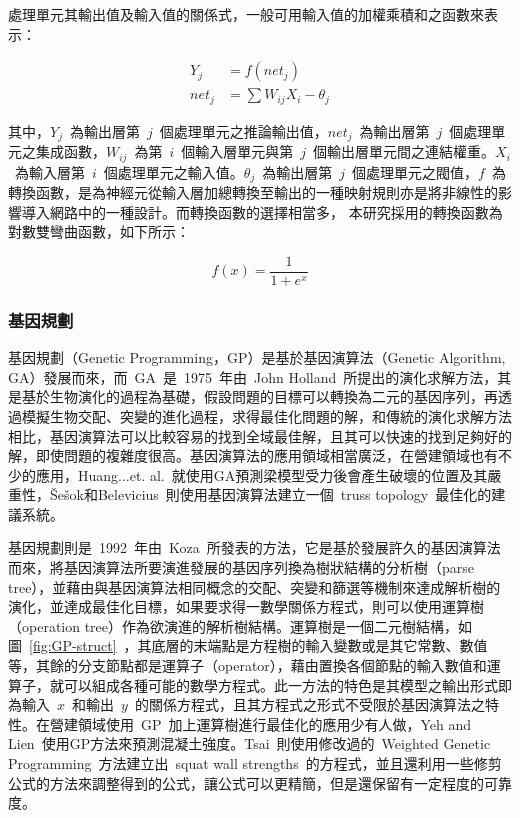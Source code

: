 處理單元其輸出值及輸入值的關係式，一般可用輸入值的加權乘積和之函數來表示：

\begin{equation}\begin{split}  Y_j &= f(net_j) \\ net_j &= \sum W_{ij}X_i - \theta_j \label{eq:anns}\end{split}\end{equation} 

其中，$Y_j$~為輸出層第~$j$~個處理單元之推論輸出值，$net_j$~為輸出層第~$j$~個處理單元之集成函數，$W_{ij}$~為第~$i$~個輸入層單元與第~$j$~個輸出層單元間之連結權重。$X_i$~為輸入層第~$i$~個處理單元之輸入值。$\theta_j$~為輸出層第~$j$~個處理單元之閥值，$f$~為轉換函數，是為神經元從輸入層加總轉換至輸出的一種映射規則亦是將非線性的影響導入網路中的一種設計。而轉換函數的選擇相當多， 本研究採用的轉換函數為對數雙彎曲函數，如下所示：

\begin{equation} f(x) = \dfrac{1}{1 + e^x}  \label{eq:annsf}\end{equation} 


\subsubsection{基因規劃}

基因規劃（Genetic Programming，GP）是基於基因演算法（Genetic Algorithm, GA）發展而來，而~GA~是~1975~年由~John Holland\cite{holland1975adaptation}~所提出的演化求解方法，其是基於生物演化的過程為基礎，假設問題的目標可以轉換為二元的基因序列，再透過模擬生物交配、突變的進化過程，求得最佳化問題的解，和傳統的演化求解方法相比，基因演算法可以比較容易的找到全域最佳解，且其可以快速的找到足夠好的解，即使問題的複雜度很高。基因演算法的應用領域相當廣泛，在營建領域也有不少的應用，Huang...et. al.\cite{minshui2009study}~就使用GA預測梁模型受力後會產生破壞的位置及其嚴重性，Šešok和Belevicius\cite{vsevsok2008global}~則使用基因演算法建立一個~truss topology~最佳化的建議系統。

基因規劃則是~1992~年由~Koza\cite{koza1992genetic}~所發表的方法，它是基於發展許久的基因演算法而來，將基因演算法所要演進發展的基因序列換為樹狀結構的分析樹（parse tree），並藉由與基因演算法相同概念的交配、突變和篩選等機制來達成解析樹的演化，並達成最佳化目標，如果要求得一數學關係方程式，則可以使用運算樹（operation tree）作為欲演進的解析樹結構。運算樹是一個二元樹結構，如圖~\ref{fig:GP-struct}~，其底層的末端點是方程樹的輸入變數或是其它常數、數值等，其餘的分支節點都是運算子（operator），藉由置換各個節點的輸入數值和運算子，就可以組成各種可能的數學方程式。此一方法的特色是其模型之輸出形式即為輸入~$x$~和輸出~$y$~的關係方程式，且其方程式之形式不受限於基因演算法之特性。在營建領域使用~GP~加上運算樹進行最佳化的應用少有人做，Yeh and Lien\cite{yeh2009knowledge}~使用GP方法來預測混凝土強度。Tsai\cite{tsai2011using}~則使用修改過的~Weighted Genetic Programming~方法建立出~squat wall strengths~的方程式，並且還利用一些修剪公式的方法來調整得到的公式，讓公式可以更精簡，但是還保留有一定程度的可靠度。

